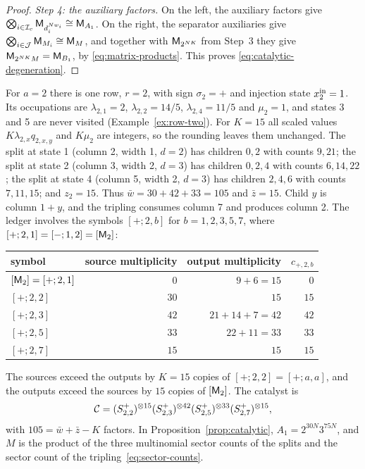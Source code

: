 \begin{proof}
\emph{Step 4: the auxiliary factors.} On the left, the auxiliary factors
give \(\bigotimes_{i\in\mathcal I_c}\mathsf M_{d_i^{Nw_i}}\cong\mathsf M_{A_1}\). On
the right, the separator auxiliaries give
\(\bigotimes_{i\in\mathcal J}\mathsf M_{M_i}\cong\mathsf M_M\), and together with
\(\mathsf M_{2^{NK}}\) from Step~3 they give \(\mathsf M_{2^{NK}M}=\mathsf M_{B_1}\), by
\eqref{eq:matrix-products}. This proves \eqref{eq:catalytic-degeneration}.
\end{proof}

\begin{example}[The ledger for \(a=2\)]\label{ex:ledger-a2}
For \(a=2\) there is one row, \(r=2\), with sign \(\sigma_2=+\) and
injection state \(x^{\mathrm{in}}_2=1\). Its occupations are \(\lambda_{2,1}=2\),
\(\lambda_{2,2}=14/5\), \(\lambda_{2,4}=11/5\) and \(\mu_2=1\), and states
3 and 5 are never visited (Example~\ref{ex:row-two}). For \(K=15\) all
scaled values \(K\lambda_{2,x}q_{2,x,y}\) and \(K\mu_2\) are integers, so the
rounding leaves them unchanged. The split at state 1 (column 2, width 1,
\(d=2\)) has children \(0,2\) with counts \(9,21\); the split at state 2
(column 3, width 2, \(d=3\)) has children \(0,2,4\) with counts
\(6,14,22\); the split at state 4 (column 5, width 2, \(d=3\)) has children
\(2,4,6\) with counts \(7,11,15\); and \(z_2=15\). Thus
\(\bar w=30+42+33=105\) and \(\bar z=15\). Child \(y\) is column \(1+y\),
and the tripling consumes column 7 and produces column 2. The ledger
involves the symbols \([+;2,b]\) for \(b=1,2,3,5,7\), where
\([+;2,1]=[-;1,2]=[\mathsf M_2]\):
\begin{center}
\begin{tabular}{lrrr}
\toprule
symbol & source multiplicity & output multiplicity
 & \(c_{+,2,b}\)\\
\midrule
\([\mathsf M_2]=[+;2,1]\) & \(0\) & \(9+6=15\) & \(0\)\\
\([+;2,2]\) & \(30\) & \(15\) & \(15\)\\
\([+;2,3]\) & \(42\) & \(21+14+7=42\) & \(42\)\\
\([+;2,5]\) & \(33\) & \(22+11=33\) & \(33\)\\
\([+;2,7]\) & \(15\) & \(15\) & \(15\)\\
\bottomrule
\end{tabular}
\end{center}
The sources exceed the outputs by \(K=15\) copies of \([+;2,2]=[+;a,a]\),
and the outputs exceed the sources by \(15\) copies of \([\mathsf M_2]\). The
catalyst is
\[
 \mathcal C=(S^+_{2,2})^{\otimes15}(S^+_{2,3})^{\otimes42}
      (S^+_{2,5})^{\otimes33}(S^+_{2,7})^{\otimes15},
\]
with \(105=\bar w+\bar z-K\) factors. In
Proposition~\ref{prop:catalytic}, \(A_1=2^{30N}3^{75N}\), and \(M\) is the
product of the three multinomial sector counts of the splits and the
sector count of the tripling~\eqref{eq:sector-counts}.
\end{example}

